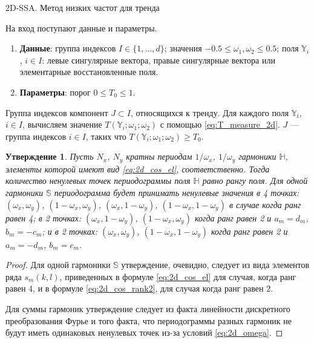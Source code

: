 \documentclass[specialist,
               substylefile = spbu.rtx,
               subf,href,colorlinks=true, 12pt]{disser}
\newtheorem{Th}{Утверждение}
\begin{document}
 \begin{algorithm}[!hhh]
\caption{2D-SSA. Метод низких частот для тренда}
\label{alg:freq2d}
\begin{algorithmic}[1]
\REQUIRE На вход поступают данные и параметры.
\begin{enumerate}
\item \textbf{Данные}: группа индексов $I \in \{1,\ldots,d\}$; значения  $-0.5 \leqslant  \omega_1, \omega_2 \leqslant 0.5$; поля $\mathbb{Y}_i$, $i \in I$: левые сингулярные вектора,
правые сингулярные вектора или элементарные восстановленные поля.
\item \textbf{Параметры}: порог $0 \leqslant T_0 \leqslant 1$.
\end{enumerate}
\ENSURE Группа индексов компонент $J \subset I$, относящихся к тренду.
\STATE  Для каждого поля $\mathbb{Y}_i$, $i \in I$, вычисляем значение $T(\mathbb{Y}_i; \omega_{1}; \omega_{2})$ с помощью \eqref{eq:T_measure_2d}.
\STATE $J$ --- группа индексов $i \in I$, таких что $T(\mathbb{Y}_i; \omega_{1}; \omega_{2}) \geqslant T_0$.
\end{algorithmic}
\end{algorithm}


\begin{Th}
Пусть $N_x$, $N_y$ кратны периодам $1/\omega_x$, $1/\omega_y$ гармоники $\mathbb{H}$, элементы которой имеют вид \eqref{eq:2d_cos_el}, соответственно.
Тогда количество ненулевых точек периодограммы поля $\mathbb{H}$ равно рангу поля. Для одной гармоники $\mathbb{S}$ периодограмма будет принимать ненулевые значения в 4 точках: $(\omega_x, \omega_y)$, $(1-\omega_x, \omega_y)$, $(\omega_x, 1-\omega_y)$, $(1-\omega_x, 1-\omega_y)$ в случае когда ранг равен 4; в 2 точках:  $(\omega_x, 1-\omega_y)$, $(1-\omega_x, \omega_y)$ когда ранг равен 2 и $a_m=d_m$, $b_m = -c_m$; и в 2 точках:  $(\omega_x, \omega_y)$, $(1-\omega_x, 1-\omega_y)$ когда ранг равен 2 и $a_m=-d_m$, $b_m = c_m$.
\end{Th}

\begin{proof}
Для одной гармоники $\mathbb{S}$ утверждение, очевидно, следует из вида элементов ряда $s_m(k,l)$, приведенных в формуле \eqref{eq:2d_cos_el} для случая, когда ранг равен 4, и в формуле \eqref{eq:2d_cos_rank2}, для случая когда ранг равен 2.

Для суммы гармоник утверждение следует из факта линейности дискретного преобразования Фурье и того факта, что периодограммы разных гармоник не будут иметь одинаковых ненулевых точек из-за условий \eqref{eq:2d_omega}.
\end{proof}
\end{document}
